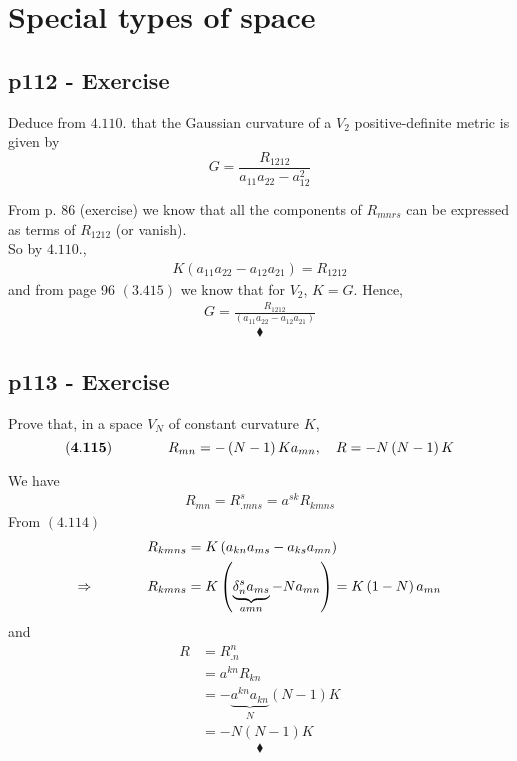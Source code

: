 \chapter{Special types of space}
\pagebreak[4]
\section{p112 - Exercise}
\begin{tcolorbox}
Deduce from $4.110.$ that the Gaussian curvature of a $V_2$ positive-definite metric is given by $$ G = \frac{R_{1212}}{a_{11}a_{22}-a_{12}^2}$$
\end{tcolorbox}
From p. 86 (exercise) we know that all the components of $R_{mnrs}$ can be expressed as terms of $R_{1212}$ (or vanish). \\
So by $4.110.$, 
\begin{align}
K\left({a_{11}a_{22}-a_{12}a_{21}}\right) = R_{1212}
\end{align}
and from page 96 $\mathbf{(3.415)}$ we know that for $V_2$, $K=G$. Hence,
\begin{align}
G = \frac{R_{1212}}{\left(a_{11}a_{22}-a_{12}a_{21}\right)}
\end{align}
$$\blacklozenge$$
\newpage

\section{p113 - Exercise}
\begin{tcolorbox}
Prove that, in a space $V_N$ of constant curvature $K$,$$\mathbf{(4.115)}\quad\quad\quad\quad R_{mn} = -\left(N-1\right)Ka_{mn}, \quad R = -N\left(N-1\right)K$$
\end{tcolorbox}
We have
\begin{align*}
R_{mn} = R^s_{.mns} = a^{sk}R_{kmns}
\end{align*}
From $\mathbf{(4.114)}$
\begin{align*}
&R_{kmns} = K\left(a_{kn}a_{ms}-a_{ks}a_{mn}\right)\\
\Rightarrow\quad\quad\quad\quad &R_{kmns}= K \left(\underbrace{\delta^s_n a_{ms}}_{a{mn}}-Na_{mn}\right)= K\left(1-N\right)a_{mn}
\end{align*}
and 
\begin{align*}
R &= R^n_{.n}\\
&= a^{kn}R_{kn}\\
&= -\underbrace{a^{kn}a_{kn}}_{N}\left( N-1 \right)K\\
&= -N\left( N-1 \right)K
\end{align*}
$$\blacklozenge$$
\newpage

